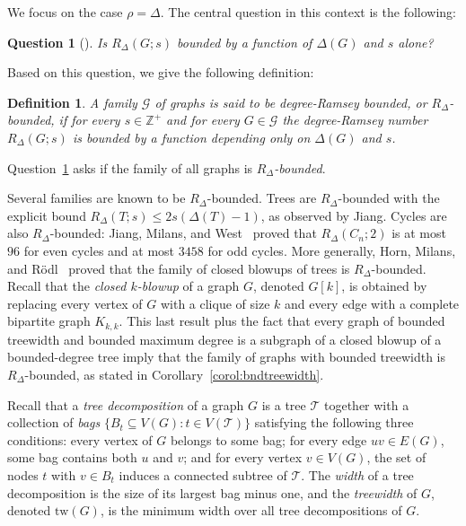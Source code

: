 \documentclass[11pt]{article}
\newtheorem{definition}[theorem]{Definition}
\newtheorem{question}[theorem]{Question}
\theoremstyle{definition}
\begin{document}
We focus on the case $\rho = \Delta$. The central question in this context is the following:
 
\begin{question}[\cite{HornMilansRodl2014}]\label{qn:main}
  Is $R_\Delta(G;s)$ bounded by a function of $\Delta(G)$ and $s$ alone?
\end{question}

Based on this question, we give the following definition:

\begin{definition}
    A family $\mathcal{G}$ of graphs is said to be \textit{degree-Ramsey bounded}, or \textit{$R_\Delta$-bounded}, if for every $s\in \mathbb{Z}^+$ and for every $G \in \mathcal{G}$ the degree-Ramsey number $R_\Delta(G;s)$ is bounded by a function depending only on $\Delta(G)$ and $s$.
\end{definition}

Question~\ref{qn:main} asks if the family of all graphs is \textit{$R_\Delta$-bounded}.
 
Several families are known to be $R_\Delta$-bounded.
Trees are $R_\Delta$-bounded with the explicit bound $R_\Delta(T;s) \leq 2s(\Delta(T)-1)$, as observed by Jiang. Cycles are also $R_\Delta$-bounded: Jiang, Milans, and West~\cite{JiangMilansWest2013} proved that $R_\Delta(C_n; 2)$ is at most $96$ for even cycles and at most $3458$ for odd cycles. More generally, Horn, Milans, and R\"{o}dl~\cite{HornMilansRodl2014} proved that the family of closed blowups of trees is $R_\Delta$-bounded. Recall that the \textit{closed $k$-blowup} of a graph $G$, denoted $G[k]$, is obtained by replacing every vertex of $G$ with a clique of size $k$ and every edge with a complete bipartite graph $K_{k,k}$. This last result plus the fact that every graph of bounded treewidth and bounded maximum degree is a subgraph of a closed blowup of a bounded-degree tree imply that the family of graphs with bounded treewidth is $R_\Delta$-bounded, as stated in Corollary~\ref{corol:bndtreewidth}.

Recall that a \textit{tree decomposition} of a graph $G$ is a tree $\mathcal{T}$ together with a collection of \textit{bags} $\{B_t \subseteq V(G) : t \in V(\mathcal{T})\}$ satisfying the following three conditions: every vertex of $G$ belongs to some bag; for every edge $uv \in E(G)$, some bag contains both $u$ and $v$; and for every vertex $v \in V(G)$, the set of nodes $t$ with $v \in B_t$ induces a connected subtree of $\mathcal{T}$. The \textit{width} of a tree decomposition is the size of its largest bag minus one, and the \textit{treewidth} of $G$, denoted $\mathrm{tw}(G)$, is the minimum width over all tree decompositions of $G$.
\end{document}
